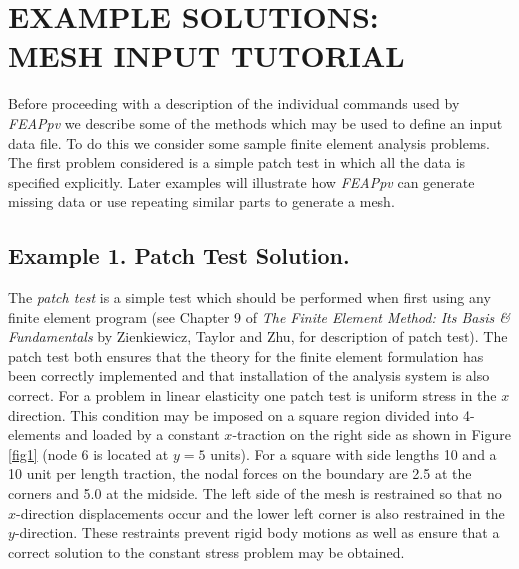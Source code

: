 \chapter[Example Solutions]{EXAMPLE SOLUTIONS: \\ MESH INPUT TUTORIAL}
\label{examples}

Before proceeding with a description of the individual commands used by
{\sl FEAPpv} we describe 
some of the methods which may be used to
define an input data file. To do this we consider some sample finite element analysis
problems.
The first problem considered is a simple patch test in which all
the data is specified explicitly.  Later examples will illustrate how
{\sl FEAPpv} can generate missing data or use repeating similar parts to generate
a mesh.

\section{Example 1.  Patch Test Solution.}
\label{ex1}

The {\it patch test} is a
simple test which should be performed when first using any finite element
program 
(see Chapter 9 of \textit{The Finite Element Method: Its Basis \& Fundamentals}
by Zienkiewicz, Taylor and Zhu, for description
of patch test). The patch test
both ensures that the theory for the finite element formulation has been
correctly implemented and that installation of the analysis
system is also correct.  For a problem in linear elasticity one patch test
is uniform stress in the $x$ direction.  This condition may be
imposed on a square region divided into 4-elements and loaded by a constant
$x$-traction on the right side as shown in Figure \ref{fig1} (node 6 is
located at $y = 5$ units).  For a square
with side lengths 10 and a 10 unit
per length traction, the nodal forces on the boundary are 2.5 at the corners
and 5.0 at the midside.  The left side of the mesh is restrained so that
no $x$-direction displacements occur and the lower left corner is also
restrained in the $y$-direction.  These restraints prevent rigid body
motions as well as ensure that a correct solution to the constant stress
problem may be obtained.

